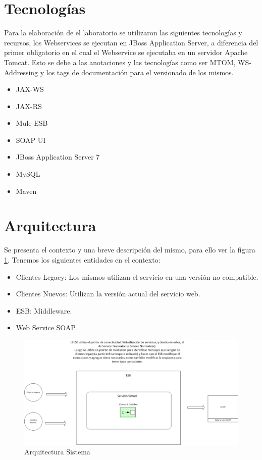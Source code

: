 \documentclass[12pt]{article}
\begin{document}
\section{Tecnologías}
Para la elaboración de el laboratorio se utilizaron las siguientes tecnologías y recursos, los Webservices se ejecutan en JBoss Application Server, a diferencia del primer obligatorio en el cual el Webservice se ejecutaba en un servidor Apache Tomcat. Esto se debe a las anotaciones y las tecnologías como ser MTOM, WS-Addressing y los tags de documentación para el versionado de los mismos.
\begin{itemize}
  \item JAX-WS
  \item JAX-RS
  \item Mule ESB
  \item SOAP UI
  \item JBoss Application Server 7
  \item MySQL
  \item Maven
\end{itemize}

\section{Arquitectura}
Se presenta el contexto y una breve descripción del mismo, para ello ver la figura \ref{fig:arq}.
Tenemos los siguientes entidades en el contexto:
\begin{itemize}
  \item Clientes Legacy: Los mismos utilizan el servicio en una versión no compatible.
  \item Clientes Nuevos: Utilizan la versión actual del servicio web.
  \item ESB: Middleware.
  \item Web Service SOAP.
\end{itemize}


  \begin{figure}[!h]
  \centering
    \includegraphics[scale=0.5]{../acmeesb/arq.png}
  \caption{Arquitectura Sistema}
  \label{fig:arq}
\end{figure} 
\end{document}
